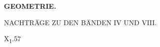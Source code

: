 \clearpage{}\NoSourceHead
{}
\vspace*{.25\textheight}
\begin{center}\Large\bfseries GEOMETRIE.\end{center}
\bigskip
\begin{center}\large NACHTRÄGE ZU DEN BÄNDEN IV UND VIII.\end{center}
\vfill\noindent X\textsubscript{1}.\hfill 57
\clearpage
